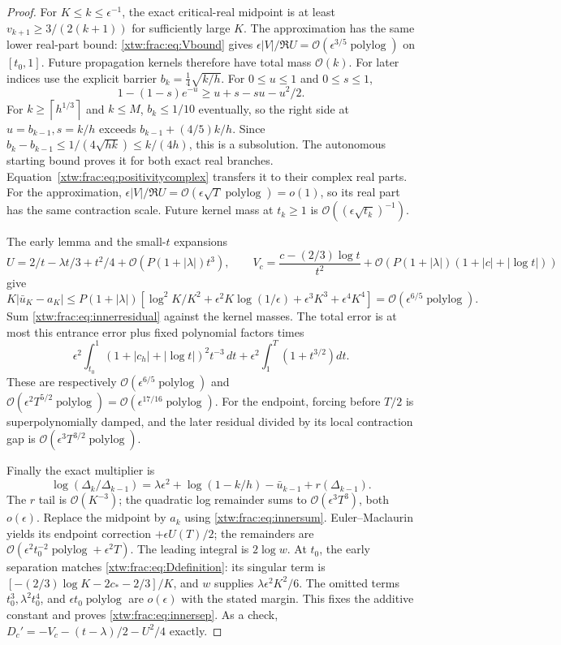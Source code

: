 \documentclass[11pt]{article}
\theoremstyle{remark}\newtheorem{remark}[theorem]{Remark}
\newcommand{\OO}{\mathcal O}
\newcommand{\ceil}[1]{\left\lceil #1\right\rceil}
\begin{document}
\begin{proof}
For $K\le k\le\epsilon^{-1}$, the exact critical-real midpoint is at least
$v_{k+1}\ge3/(2(k+1))$ for sufficiently large $K$. The approximation has
the same lower real-part bound: \eqref{xtw:frac:eq:Vbound} gives
$\epsilon|V|/\Re U=\OO(\epsilon^{3/5}\operatorname{polylog})$ on
$[t_0,1]$. Future propagation kernels therefore have total mass $\OO(k)$.
For later indices use the explicit barrier $b_k=\frac14\sqrt{k/h}$.
For $0\le u\le1$ and $0\le s\le1$,
\[
 1-(1-s)e^{-u}\ge u+s-su-u^2/2.
\]
For $k\ge\ceil{h^{1/3}}$ and $k\le M$, $b_k\le1/10$ eventually,
so the right side at $u=b_{k-1},s=k/h$ exceeds
$b_{k-1}+(4/5)k/h$. Since
$b_k-b_{k-1}\le1/(4\sqrt{hk})\le k/(4h)$, this is a subsolution.
The autonomous starting bound proves it for both exact real branches.
Equation~\eqref{xtw:frac:eq:positivitycomplex} transfers it to their complex real
parts. For the approximation,
$\epsilon|V|/\Re U=\OO(\epsilon\sqrt T\operatorname{polylog})=o(1)$,
so its real part has the same contraction scale. Future kernel mass at
$t_k\ge1$ is $\OO((\epsilon\sqrt{t_k})^{-1})$.

The early lemma and the small-$t$ expansions
\begin{equation}\label{xtw:frac:eq:smallUV}
 U=2/t-\lambda t/3+t^2/4+\OO(P(1+|\lambda|)t^3),\qquad
 V_c=\frac{c-(2/3)\log t}{t^2}+\OO(P(1+|\lambda|)(1+|c|+|\log t|))
\end{equation}
give
\[
 K|\bar u_K-a_K|\le P(1+|\lambda|)
 [\log^2K/K^2+\epsilon^2K\log(1/\epsilon)
                      +\epsilon^3K^3+\epsilon^4K^4]
 =\OO(\epsilon^{6/5}\operatorname{polylog}).
\]
Sum \eqref{xtw:frac:eq:innerresidual} against the kernel masses. The total error is
at most this entrance error plus fixed polynomial factors times
\[
 \epsilon^2\int_{t_0}^1
 (1+|c_h|+|\log t|)^2t^{-3}\,dt
 +\epsilon^2\int_1^T(1+t^{3/2})dt.
\]
These are respectively $\OO(\epsilon^{6/5}\operatorname{polylog})$ and
$\OO(\epsilon^2T^{5/2}\operatorname{polylog})
=\OO(\epsilon^{17/16}\operatorname{polylog})$.
For the endpoint, forcing before $T/2$ is superpolynomially damped, and
the later residual divided by its local contraction gap is
$\OO(\epsilon^3T^{3/2}\operatorname{polylog})$.

Finally the exact multiplier is
\[
 \log(\Delta_k/\Delta_{k-1})=
 \lambda\epsilon^2+\log(1-k/h)-\bar u_{k-1}+r(\Delta_{k-1}).
\]
The $r$ tail is $\OO(K^{-3})$; the quadratic log remainder sums to
$\OO(\epsilon^3T^3)$, both $o(\epsilon)$. Replace the midpoint by $a_k$
using \eqref{xtw:frac:eq:innersum}. Euler--Maclaurin yields its endpoint correction
$+\epsilon U(T)/2$; the remainders are
$\OO(\epsilon^2t_0^{-2}\operatorname{polylog}+\epsilon^2T)$.
The leading integral is $2\log w$.
At $t_0$, the early separation matches \eqref{xtw:frac:eq:Ddefinition}: its singular
term is $[-(2/3)\log K-2c_*-2/3]/K$, and $w$ supplies
$\lambda\epsilon^2K^2/6$.
The omitted terms $t_0^3,\lambda^2t_0^4$, and
$\epsilon t_0\operatorname{polylog}$ are $o(\epsilon)$ with the stated
margin. This fixes the additive constant and proves \eqref{xtw:frac:eq:innersep}.
As a check, $D_c'=-V_c-(t-\lambda)/2-U^2/4$ exactly.
\end{proof}
\end{document}
